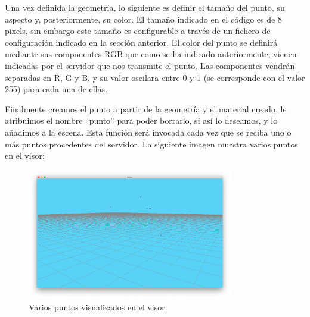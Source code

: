 Una vez definida la geometría, lo siguiente es definir el tamaño del punto, su aspecto y, posteriormente, su color. El tamaño indicado en el código es de 8 pixels, sin embargo este tamaño es configurable a través de un fichero de configuración indicado en la sección anterior. El color del punto se definirá mediante sus componentes RGB que como se ha indicado anteriormente, vienen indicadas por el servidor que nos transmite el punto. Las componentes vendrán separadas en R, G y B, y su valor oscilara entre 0 y 1 (se corresponde con el valor 255) para cada una de ellas.


Finalmente creamos el punto a partir de la geometría y el material creado, le atribuimos el nombre ``punto'' para poder borrarlo, si así lo deseamos, y lo añadimos a la escena.
Esta función será invocada cada vez que se reciba uno o más puntos procedentes del servidor. La siguiente imagen muestra varios puntos en el visor:
\begin{figure}[H]
  \begin{center}
    \includegraphics[width=0.8\textwidth]{figures/visualizarpuntos.png}
		\caption{Varios puntos visualizados en el visor}
		\label{fig.visualizarpuntos}
		\end{center}
\end{figure}
